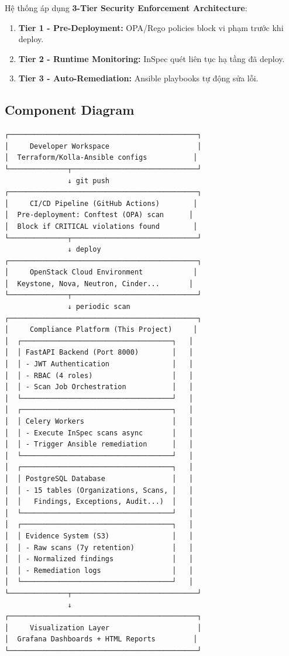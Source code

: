 \documentclass[12pt,a4paper]{report}
\begin{document}
Hệ thống áp dụng \textbf{3-Tier Security Enforcement Architecture}:

\begin{enumerate}
    \item \textbf{Tier 1 - Pre-Deployment:} OPA/Rego policies block vi phạm trước khi deploy.
    \item \textbf{Tier 2 - Runtime Monitoring:} InSpec quét liên tục hạ tầng đã deploy.
    \item \textbf{Tier 3 - Auto-Remediation:} Ansible playbooks tự động sửa lỗi.
\end{enumerate}

\subsection{Component Diagram}

\begin{verbatim}
┌─────────────────────────────────────────────┐
│     Developer Workspace                     │
│  Terraform/Kolla-Ansible configs           │
└──────────────┬──────────────────────────────┘
               ↓ git push
┌─────────────────────────────────────────────┐
│     CI/CD Pipeline (GitHub Actions)        │
│  Pre-deployment: Conftest (OPA) scan      │
│  Block if CRITICAL violations found        │
└──────────────┬──────────────────────────────┘
               ↓ deploy
┌─────────────────────────────────────────────┐
│     OpenStack Cloud Environment            │
│  Keystone, Nova, Neutron, Cinder...       │
└──────────────┬──────────────────────────────┘
               ↓ periodic scan
┌─────────────────────────────────────────────┐
│     Compliance Platform (This Project)     │
│  ┌────────────────────────────────────┐   │
│  │ FastAPI Backend (Port 8000)        │   │
│  │ - JWT Authentication               │   │
│  │ - RBAC (4 roles)                   │   │
│  │ - Scan Job Orchestration           │   │
│  └────────────────────────────────────┘   │
│  ┌────────────────────────────────────┐   │
│  │ Celery Workers                     │   │
│  │ - Execute InSpec scans async       │   │
│  │ - Trigger Ansible remediation      │   │
│  └────────────────────────────────────┘   │
│  ┌────────────────────────────────────┐   │
│  │ PostgreSQL Database                │   │
│  │ - 15 tables (Organizations, Scans, │   │
│  │   Findings, Exceptions, Audit...)  │   │
│  └────────────────────────────────────┘   │
│  ┌────────────────────────────────────┐   │
│  │ Evidence System (S3)               │   │
│  │ - Raw scans (7y retention)         │   │
│  │ - Normalized findings              │   │
│  │ - Remediation logs                 │   │
│  └────────────────────────────────────┘   │
└──────────────┬──────────────────────────────┘
               ↓
┌─────────────────────────────────────────────┐
│     Visualization Layer                     │
│  Grafana Dashboards + HTML Reports         │
└─────────────────────────────────────────────┘
\end{verbatim}
\end{document}
